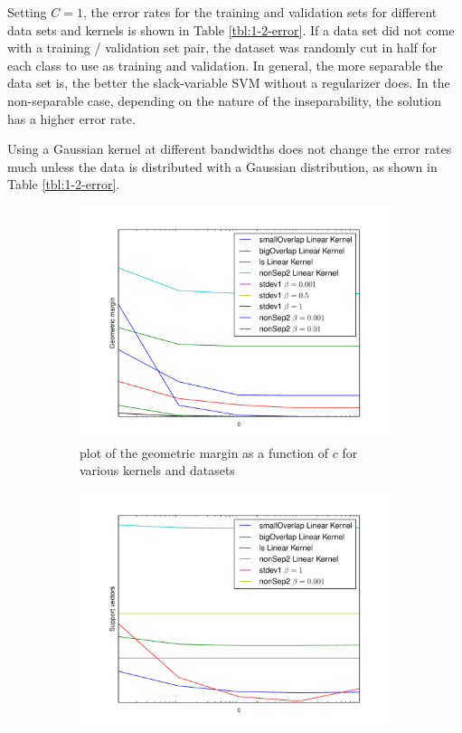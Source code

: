 \documentclass[10pt]{article}
\begin{document}
Setting $C = 1$, the error rates for the training and validation sets for different data sets and kernels is shown in Table \ref{tbl:1-2-error}. If a data set did not come with a training / validation set pair, the dataset was randomly cut in half for each class to use as training and validation. In general, the more separable the data set is, the better the slack-variable SVM without a regularizer does. In the non-separable case, depending on the nature of the inseparability, the solution has a higher error rate.

Using a Gaussian kernel at different bandwidths does not change the error rates much unless the data is distributed with a Gaussian distribution, as shown in Table \ref{tbl:1-2-error}.

\begin{figure}[!ht]
\centering
\begin{subfigure}[b]{0.46\textwidth}
	\centering
	\includegraphics[width=\textwidth]{1-3-c-margin.pdf}
	\caption{plot of the geometric margin as a function of $c$ for various kernels and datasets}
	\label{fig:1-3-c-margin}
\end{subfigure}
\begin{subfigure}[b]{0.46\textwidth}
	\centering
	\includegraphics[width=\textwidth]{1-3-support-vectors.pdf}

\end{subfigure}
\end{figure}
\end{document}

